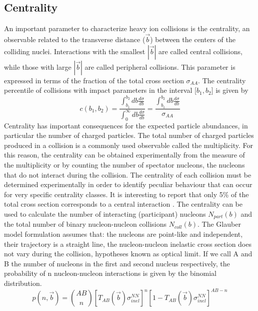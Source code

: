 \documentclass[12pt,a4paper]{book}
\begin{document}
	\subsection{Centrality}
	An important parameter to characterize heavy ion collisions is the centrality, an observable related to the transverse distance ($\vec{b}$) between the centers of the colliding nuclei. Interactions with the smallest $|\vec{b}|$ are called central collisions, while those with large $|\vec{b}|$ are called peripheral collisions. This parameter is expressed in terms of the fraction of the total cross section $\sigma_{AA}$. The centrality percentile of collisions with impact parameters in the interval [$b_1,b_2$] is given by
	\begin{equation}
		c(b_1,b_2)=\frac{\int_{b_1}^{b_2} db \frac{d\sigma}{db}}{\int_{0}^{\infty} db \frac{d\sigma}{db}} = \frac{\int_{b_1}^{b_2} db \frac{d\sigma}{db}}{\sigma_{AA}}
		\label{eq:centrrality1}
	\end{equation}
	Centrality has important consequences for the expected particle abundances, in particular the number of charged particles. The total number of charged particles produced in a collision is a commonly used observable called the multiplicity. For this reason, the centrality can be obtained experimentally from the measure of the multiplicity or by counting the number of spectator nucleons, the nucleons that do not interact during the collision. The centrality of each collision must be determined experimentally in order to identify peculiar behaviour that can occur for very specific centrality classes. It is interesting to report that only 5\% of the total cross section corresponds to a central interaction \cite{amsdottorato9036}.
	The centrality can be used to calculate the number of interacting (participant) nucleons $N_{part}(b)$ and the total number of binary nucleon-nucleon collisions $N_{coll}(b)$. The Glauber model formulation \cite{Miller_2007} assumes that: the nucleons are point-like and independent, their trajectory is a straight line, the nucleon-nucleon inelastic cross section does not vary during the collision, hypotheses known as optical limit. If we call A and B the number of nucleons in the first and second nucleus respectively, the probability of n nucleon-nucleon interactions is given by the binomial distribution.
	\begin{equation}
		p(n,\vec{b})= \binom{AB}{n} \left[T_{AB}(\vec{b}) \sigma_{inel}^{NN}\right]^n \left[1-T_{AB}(\vec{b}) \sigma_{inel}^{NN}\right]^{AB-n}
		\label{eq:prob_interaction}
	\end{equation}
\end{document}
